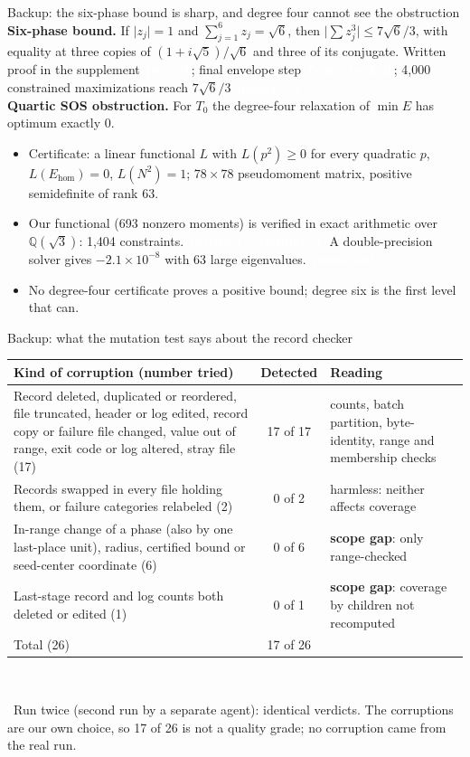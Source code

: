 \documentclass[aspectratio=169,11pt,t]{beamer}
\newcommand{\tg}[2]{{\setlength{\fboxsep}{1.2pt}\colorbox{#1}{\textcolor{white}{\sffamily\bfseries\footnotesize\,#2\,}}}}
\newcommand{\Tproved}{\tg{cProved}{proved}}
\newcommand{\Tlean}{\tg{cLeanH}{Lean-checked}}
\newcommand{\Tcert}{\tg{cCert}{certified / computed}}
\newcommand{\Tcomp}{\tg{cCert}{certified / computed}}
\newcommand{\Tnum}{\tg{cNum}{numerical}}
\newcommand{\abs}[1]{\lvert #1\rvert}
\begin{document}
\begin{frame}{Backup: the six-phase bound is sharp, and degree four cannot see the obstruction}
\footnotesize
\textbf{Six-phase bound.} If $\abs{z_j}=1$ and $\sum_{j=1}^6z_j=\sqrt6$, then $\abs{\sum z_j^3}\le7\sqrt6/3$, with equality at three copies of $(1+i\sqrt5)/\sqrt6$ and three of its conjugate. Written proof in the supplement \Tproved; final envelope step \Tlean; 4,000 constrained maximizations reach $7\sqrt6/3$ \Tnum\\[0.2cm]
\textbf{Quartic SOS obstruction.} For $T_0$ the degree-four relaxation of $\min E$ has optimum exactly $0$.
\begin{itemize}\setlength\itemsep{2pt}
\item Certificate: a linear functional $L$ with $L(p^2)\ge0$ for every quadratic $p$, $L(E_{\mathrm{hom}})=0$, $L(N^2)=1$; $78\times78$ pseudomoment matrix, positive semidefinite of rank $63$.
\item Our functional (693 nonzero moments) is verified in exact arithmetic over $\mathbb{Q}(\sqrt3)$: 1,404 constraints. \Tcert\ A double-precision solver gives $-2.1\times10^{-8}$ with 63 large eigenvalues. \Tnum
\item No degree-four certificate proves a positive bound; degree six is the first level that can.
\end{itemize}
\end{frame}

\begin{frame}{Backup: what the mutation test says about the record checker}
\centering\footnotesize
\renewcommand{\arraystretch}{1.0}
\begin{tabular}{@{}>{\raggedright\arraybackslash}p{7.4cm}c>{\raggedright\arraybackslash}p{4.8cm}@{}}
\toprule
Kind of corruption (number tried) & Detected & Reading\\
\midrule
Record deleted, duplicated or reordered, file truncated, header or log edited, record copy or failure file changed, value out of range, exit code or log altered, stray file (17) & 17 of 17 & counts, batch partition, byte-identity, range and membership checks\\
Records swapped in every file holding them, or failure categories relabeled (2) & 0 of 2 & harmless: neither affects coverage\\
In-range change of a phase (also by one last-place unit), radius, certified bound or seed-center coordinate (6) & 0 of 6 & \textbf{scope gap}: only range-checked\\
Last-stage record and log counts both deleted or edited (1) & 0 of 1 & \textbf{scope gap}: coverage by children not recomputed\\
\midrule
Total (26) & 17 of 26 & \\
\bottomrule
\end{tabular}\\[0.1cm]
\raggedright\footnotesize\hspace{0.2cm}\Tcomp\ Run twice (second run by a separate agent): identical verdicts. The corruptions are our own choice, so 17 of 26 is not a quality grade; no corruption came from the real run.
\end{frame}
\end{document}
